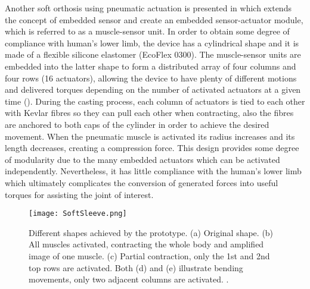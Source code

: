 Another soft orthosis using pneumatic actuation is presented in \cite{Park2012} which extends the concept of embedded sensor and create an embedded sensor-actuator module, which is referred to as a muscle-sensor unit. In order to obtain some degree of compliance with human's lower limb, the device has a cylindrical shape and it is made of a flexible silicone elastomer (EcoFlex 0300). The muscle-sensor units are embedded into the latter shape to form a distributed array of four columns and four rows (16 actuators), allowing the device to have plenty of different motions and delivered torques depending on the number of activated actuators at a given time (). During the casting process, each column of actuators is tied to each other with Kevlar fibres so they can pull each other when contracting, also the fibres are anchored to both caps of the cylinder in order to achieve the desired movement. When the pneumatic muscle is activated its radius increases and its length decreases, creating a compression force. This design provides some degree of modularity due to the many embedded actuators which can be activated independently. Nevertheless, it has little compliance with the human's lower limb which ultimately complicates the conversion of generated forces into useful torques for assisting the joint of interest.
\begin{figure}[hbtp!]
    \centering
    \texttt{[image: SoftSleeve.png]}
    \caption{Different shapes achieved by the prototype. (a) Original shape. (b) All muscles activated, contracting the whole body and amplified image of one muscle. (c) Partial contraction, only the 1st and 2nd top rows are activated. Both (d) and (e) illustrate bending movements, only two adjacent columns are activated. \cite{Park2012}. }
    \label{fig:soft_sleeve}
\end{figure}


